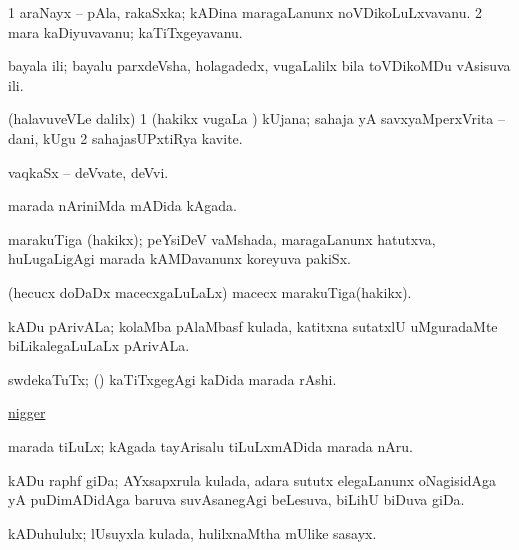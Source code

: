 \bentry
{} 
\gl{\nA}
\expl{}
\bmng
\bnum
\num{1} araNayx -- pAla, rakaSxka; kADina maragaLanunx noVDikoLuLxvavanu. 
\num{2} mara kaDiyuvavanu; kaTiTxgeyavanu. 
\enum
\emng
\eentry

\bentry
{} 
\gl{\nA}
\bmng
bayala ili; bayalu parxdeVsha, holagadedx, \mo vugaLalilx bila toVDikoMDu vAsisuva ili. 
\emng
\eentry

\bentry
{} 
\gl{\nA}
\expl{}
\bmng
(halavuveVLe \bava dalilx) 
\bnum
\num{1} (hakikx \mo vugaLa \vi) kUjana; sahaja yA savxyaMperxVrita -- dani, kUgu 
\num{2} sahajasUPxtiRya kavite. 
\enum
\emng
\eentry

\bentry
{} 
\gl{\nA}
\expl{}
\bmng
vaqkaSx -- deVvate, deVvi. 
\emng
\eentry

\bentry
{} 
\gl{\nA}
\expl{}
\bmng
marada nAriniMda mADida kAgada. 
\emng
\eentry

\bentry
{} 
\gl{\nA}
\expl{}
\bmng
marakuTiga (hakikx); peYsiDeV vaMshada, maragaLanunx hatutxva, huLugaLigAgi marada kAMDavanunx koreyuva pakiSx. 
\emng
\eentry

\bentry
{} 
\gl{\nA}
\expl{}
\bmng
(hecucx doDaDx macecxgaLuLaLx) macecx marakuTiga(hakikx). 
\emng
\eentry

\bentry
{} 
\gl{\nA}
\expl{}
\bmng
kADu pArivALa; kolaMba pAlaMbasf kulada, katitxna sutatxlU uMguradaMte biLikalegaLuLaLx pArivALa. 
\emng
\eentry

\bentry
{} 
\gl{\nA}
\expl{}
\bmng
swdekaTuTx; (\kanmu) kaTiTxgegAgi kaDida marada rAshi. 
\emng

\noindent
\gl{\pagu}
\expl{}
\bmng
{} \hyperref{kandict_n.pdf}{N}{nigger pagu(1)}{nigger}  
\emng
\eentry
 
\bentry
{} 
\gl{\nA}
\expl{}
\bmng
marada tiLuLx; kAgada tayArisalu tiLuLxmADida marada nAru. 
\emng
\eentry

\bentry
{} 
\gl{\nA}
\expl{}
\bmng
kADu raphf giDa; AYxsapxrula kulada, adara sututx elegaLanunx oNagisidAga yA puDimADidAga baruva suvAsanegAgi beLesuva, biLihU biDuva giDa. 
\emng
\eentry

\bentry
{} 
\gl{\nA}
\expl{}
\bmng
kADuhululx; lUsuyxla kulada, hulilxnaMtha mUlike sasayx. 
\emng
\eentry

